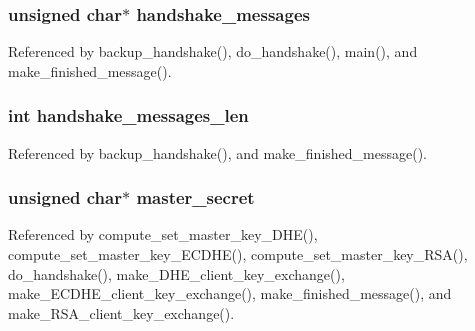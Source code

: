 \subsubsection[{\texorpdfstring{handshake\+\_\+messages}{handshake_messages}}]{\setlength{\rightskip}{0pt plus 5cm}unsigned char$\ast$ handshake\+\_\+messages}\hypertarget{struct_t_l_s__parameters__t_ac6734c87e703c22f7d34f71ca116d005}{}\label{struct_t_l_s__parameters__t_ac6734c87e703c22f7d34f71ca116d005}


Referenced by backup\+\_\+handshake(), do\+\_\+handshake(), main(), and make\+\_\+finished\+\_\+message().

\subsubsection[{\texorpdfstring{handshake\+\_\+messages\+\_\+len}{handshake_messages_len}}]{\setlength{\rightskip}{0pt plus 5cm}int handshake\+\_\+messages\+\_\+len}\hypertarget{struct_t_l_s__parameters__t_afbdbb7d32255aef8951f95ccc44957fc}{}\label{struct_t_l_s__parameters__t_afbdbb7d32255aef8951f95ccc44957fc}


Referenced by backup\+\_\+handshake(), and make\+\_\+finished\+\_\+message().

\subsubsection[{\texorpdfstring{master\+\_\+secret}{master_secret}}]{\setlength{\rightskip}{0pt plus 5cm}unsigned char$\ast$ master\+\_\+secret}\hypertarget{struct_t_l_s__parameters__t_a68c2015df5cb7259aa1abdee33c8e6f3}{}\label{struct_t_l_s__parameters__t_a68c2015df5cb7259aa1abdee33c8e6f3}


Referenced by compute\+\_\+set\+\_\+master\+\_\+key\+\_\+\+D\+H\+E(), compute\+\_\+set\+\_\+master\+\_\+key\+\_\+\+E\+C\+D\+H\+E(), compute\+\_\+set\+\_\+master\+\_\+key\+\_\+\+R\+S\+A(), do\+\_\+handshake(), make\+\_\+\+D\+H\+E\+\_\+client\+\_\+key\+\_\+exchange(), make\+\_\+\+E\+C\+D\+H\+E\+\_\+client\+\_\+key\+\_\+exchange(), make\+\_\+finished\+\_\+message(), and make\+\_\+\+R\+S\+A\+\_\+client\+\_\+key\+\_\+exchange().

